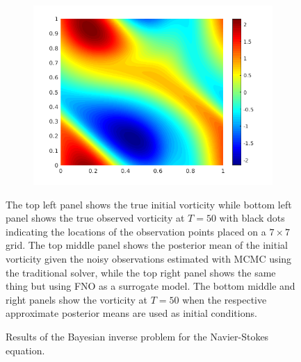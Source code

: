 \documentclass{article} %
\begin{document}
\begin{figure}[t]
\begin{subfigure}[b]{0.32\textwidth}
        \includegraphics[width=\textwidth]{figs/gumean_approx.png}
    \end{subfigure}
{\small The top left panel shows the true initial vorticity while bottom left panel shows the true observed vorticity at $T=50$ with black dots indicating the locations of the observation points placed on a $7 \times 7$ grid. The top middle panel shows the posterior mean of the initial vorticity given the noisy observations estimated with MCMC using the traditional solver, while the top right panel shows the same thing but using FNO as a surrogate model. The bottom middle and right panels show the vorticity at $T=50$ when the respective approximate posterior means are used as initial conditions. }
    \caption{Results of the Bayesian inverse problem for the Navier-Stokes equation. } 
    \label{fig:baysian} 
\end{figure}
\end{document}

